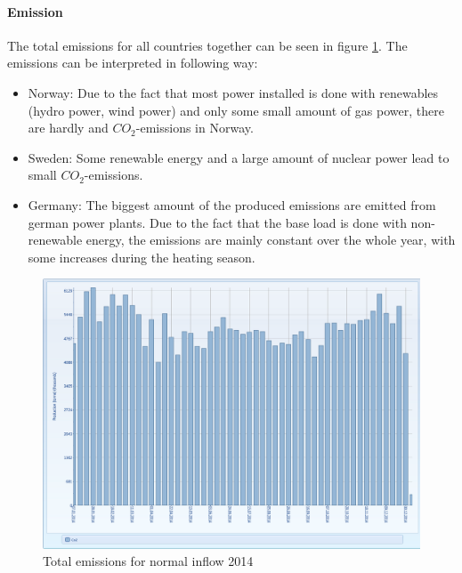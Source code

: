 \documentclass{article}
\begin{document}
\paragraph{Emission\\}
The total emissions for all countries together can be seen in figure \ref{fig:MTemissionsnormal}. The emissions can be interpreted in following way:
\begin{itemize}
\item Norway: Due to the fact that most power installed is done with renewables (hydro power, wind power) and only some small amount of gas power, there are hardly and $CO_2$-emissions in Norway.
\item Sweden: Some renewable energy and a large amount of nuclear power lead to small $CO_2$-emissions. 
\item Germany: The biggest amount of the produced emissions are emitted from german power plants. Due to the fact that the base load is done with non-renewable energy, the emissions are mainly constant over the whole year, with some increases during the heating season.
\end{itemize}
\begin{figure}[htbp]
\begin{center}
\includegraphics[width=13cm,keepaspectratio=true]{figures/MTCO2}
\caption{Total emissions for normal inflow 2014}
\label{fig:MTemissionsnormal}
\end{center}
\end{figure}
\end{document}
